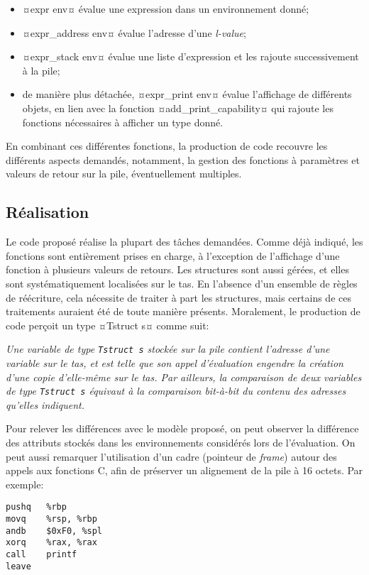 \documentclass{rapport}
\begin{document}
\begin{itemize}
    \item ¤expr env¤ évalue une expression dans un environnement donné;
    \item ¤expr_address env¤ évalue l'adresse d'une \emph{l-value};
    \item ¤expr_stack env¤ évalue une liste d'expression et les rajoute successivement à la pile;
    \item de manière plus détachée, ¤expr_print env¤ évalue l'affichage de différents objets, en lien avec la fonction ¤add_print_capability¤ qui rajoute les fonctions nécessaires à afficher un type donné.
\end{itemize}

En combinant ces différentes fonctions, la production de code recouvre les différents aspects demandés, notamment, la gestion des fonctions à paramètres et valeurs de retour sur la pile, éventuellement multiples.

\subsection{Réalisation}
Le code proposé réalise la plupart des tâches demandées. Comme déjà indiqué, les fonctions sont entièrement prises en charge, à l'exception de l'affichage d'une fonction à plusieurs valeurs de retours. Les structures sont aussi gérées, et elles sont systématiquement localisées sur le tas. En l'absence d'un ensemble de règles de réécriture, cela nécessite de traiter à part les structures, mais certains de ces traitements auraient été de toute manière présents. Moralement, le production de code perçoit un type ¤Tstruct s¤ comme suit:

\emph{Une variable de type \texttt{Tstruct s} stockée sur la pile contient l'adresse d'une variable sur le tas, et est telle que son appel d'évaluation engendre la création d'une copie d'elle-même sur le tas. Par ailleurs, la comparaison de deux variables de type \texttt{Tstruct s} équivaut à la comparaison bit-à-bit du contenu des adresses qu'elles indiquent.}

Pour relever les différences avec le modèle proposé, on peut observer la différence des attributs stockés dans les environnements considérés lors de l'évaluation. On peut aussi remarquer l'utilisation d'un cadre (pointeur de \emph{frame}) autour des appels aux fonctions \textsf{C}, afin de préserver un alignement de la pile à 16 octets. Par exemple:

\begin{lstlisting}
pushq	%rbp
movq	%rsp, %rbp
andb	$0xF0, %spl
xorq	%rax, %rax
call	printf
leave
\end{lstlisting}
\end{document}

